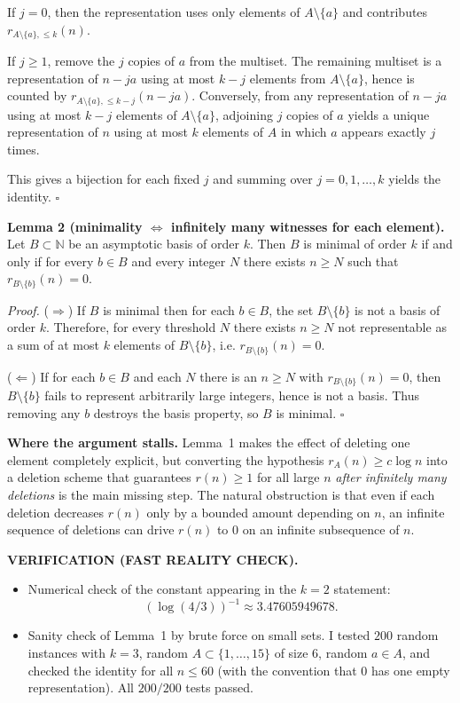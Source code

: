 If $j=0$, then the representation uses only elements of $A\setminus\{a\}$ and contributes $r_{A\setminus\{a\},\le k}(n)$.

If $j\ge 1$, remove the $j$ copies of $a$ from the multiset. The remaining multiset is a representation of $n-ja$ using at most $k-j$ elements from $A\setminus\{a\}$, hence is counted by $r_{A\setminus\{a\},\le k-j}(n-ja)$. Conversely, from any representation of $n-ja$ using at most $k-j$ elements of $A\setminus\{a\}$, adjoining $j$ copies of $a$ yields a unique representation of $n$ using at most $k$ elements of $A$ in which $a$ appears exactly $j$ times.

This gives a bijection for each fixed $j$ and summing over $j=0,1,\dots,k$ yields the identity.
\hfill$\square$

\medskip
\noindent\textbf{Lemma 2 (minimality $\Leftrightarrow$ infinitely many witnesses for each element).}
Let $B\subset\mathbb N$ be an asymptotic basis of order $k$. Then $B$ is minimal of order $k$ if and only if for every $b\in B$ and every integer $N$ there exists $n\ge N$ such that $r_{B\setminus\{b\}}(n)=0$.

\noindent\emph{Proof.}
($\Rightarrow$) If $B$ is minimal then for each $b\in B$, the set $B\setminus\{b\}$ is not a basis of order $k$. Therefore, for every threshold $N$ there exists $n\ge N$ not representable as a sum of at most $k$ elements of $B\setminus\{b\}$, i.e. $r_{B\setminus\{b\}}(n)=0$.

($\Leftarrow$) If for each $b\in B$ and each $N$ there is an $n\ge N$ with $r_{B\setminus\{b\}}(n)=0$, then $B\setminus\{b\}$ fails to represent arbitrarily large integers, hence is not a basis. Thus removing any $b$ destroys the basis property, so $B$ is minimal.
\hfill$\square$

\medskip
\noindent\textbf{Where the argument stalls.}
Lemma~1 makes the effect of deleting one element completely explicit, but converting the hypothesis
$r_A(n)\ge c\log n$ into a deletion scheme that guarantees $r(n)\ge 1$ for all large $n$ \emph{after infinitely many deletions} is the main missing step.
The natural obstruction is that even if each deletion decreases $r(n)$ only by a bounded amount depending on $n$, an infinite sequence of deletions can drive $r(n)$ to $0$ on an infinite subsequence of $n$.

\medskip
\noindent\textbf{VERIFICATION (FAST REALITY CHECK).}
\begin{itemize}
\item Numerical check of the constant appearing in the $k=2$ statement:
\[
(\log(4/3))^{-1}\approx 3.47605949678.
\]
\item Sanity check of Lemma~1 by brute force on small sets.
I tested $200$ random instances with $k=3$, random $A\subset\{1,\dots,15\}$ of size $6$, random $a\in A$, and checked the identity for all $n\le 60$ (with the convention that $0$ has one empty representation). All $200/200$ tests passed.
\end{itemize}

